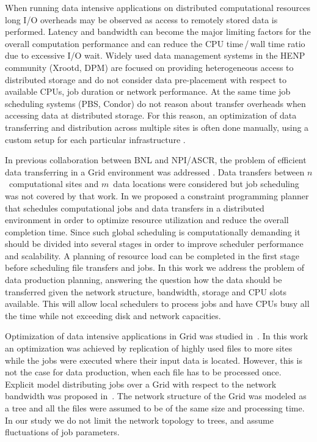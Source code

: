 \documentclass{svjour3}                     %
\begin{document}
When running data intensive applications on distributed computational
resources long I/O overheads may be observed as access to remotely stored data
is performed. Latency and bandwidth can become the major limiting factors for
the overall computation performance and can reduce the CPU time\,/\,wall time 
ratio due to excessive I/O wait. 
Widely used data management systems in the HENP community
(Xrootd, DPM) are focused on providing heterogeneous access to distributed
storage and do not consider data pre-placement with respect to available CPUs,
job duration or network performance. At the same time job scheduling systems
(PBS, Condor) do not reason about transfer overheads when accessing data at
distributed storage. For this reason, an optimization of data transferring and
distribution across multiple sites is often done manually, using a custom
setup for each particular infrastructure \cite{Balewski_2012pa}. 

In previous collaboration between BNL and NPI/ASCR, the problem of
efficient data transferring in a Grid environment was addressed \cite{Zerola}.
Data transfers between $n$~computational sites and $m$~data locations were
considered but job scheduling was not covered
by that work. In \cite{ACAT_2014} we
proposed a constraint programming planner that schedules computational jobs
and data transfers in a distributed environment in order to optimize resource
utilization and reduce the overall completion time. Since such global
scheduling is computationally demanding it should be divided into several
stages in order to improve scheduler performance and scalability. A planning of
resource load can be completed in the first stage before scheduling file
transfers and jobs. In this work we address the problem of data production
planning, answering the question how the data should be transferred given the
network structure, bandwidth, storage and CPU slots available. This will allow
local schedulers to process jobs and have CPUs busy all the time while not
exceeding disk and network capacities.

Optimization of data intensive applications in Grid was studied
in~\cite{Globus_scheduler}. In this work an optimization was achieved by
replication of highly used files to more sites while the jobs were executed
where their input data is located. However, this is not the case for data
production, when each file has to be processed once. 
%
Explicit model distributing jobs over a Grid with respect to the network
bandwidth was proposed in~\cite{Trees}. The network structure of the Grid was
modeled as a tree and all the files were assumed to be of the same size and
processing time. In our study we do not limit the network topology to trees,
and assume fluctuations of job parameters. 
\end{document}
